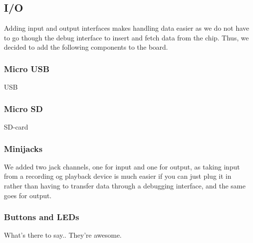 \subsection{I/O}
Adding input and output interfaces makes handling data easier as we do not have to go though the debug interface to insert and fetch data from the chip. Thus, we decided to add the following components to the board.
\subsubsection{Micro USB}
USB 
\subsubsection{Micro SD}
SD-card 
\subsubsection{Minijacks}
We added two jack channels, one for input and one for output, as taking input from a recording og playback device is much easier if you can just plug it in rather than having to transfer data through a debugging interface, and the same goes for output.
\subsubsection{Buttons and LEDs}
What's there to say.. They're awesome.